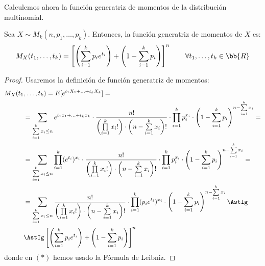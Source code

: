 Calculemos ahora la función generatriz de momentos de la distribución multinomial.
\begin{prop}
    Sea $X\sim M_k(n, p_1, \ldots, p_k)$. Entonces, la función generatriz de momentos de $X$ es:
    \begin{equation*}
        M_X(t_1, \ldots, t_k)=\left[\left(\sum_{i=1}^k p_i e^{t_i}\right) + \left(1-\sum_{i=1}^k p_i\right)\right]^n \qquad \forall t_1, \ldots, t_k\in \bb{R}
    \end{equation*}
\end{prop}
\begin{proof}
    Usaremos la definición de función generatriz de momentos:
    \begin{align*}
        M_X(t_1&, \ldots, t_k)=E[e^{t_1 X_1+\ldots+t_k X_k}]
        =\\&=
        \sum_{\sum\limits_{i=1}^k x_i\leq n} e^{t_1 x_1+\ldots+t_k x_k}\cdot \dfrac{n!}{\left(\prod\limits_{i=1}^k x_i!\right)\cdot \left(n-\sum\limits_{i=1}^k x_i\right)!}\cdot \prod_{i=1}^{k} p_i^{x_i} \cdot \left(1-\sum\limits_{i=1}^k p_i\right)^{n-\sum\limits_{i=1}^k x_i}
        =\\&=
        \sum_{\sum\limits_{i=1}^k x_i\leq n} \prod_{i=1}^k (e^{t_i})^{x_i}\cdot \dfrac{n!}{\left(\prod\limits_{i=1}^k x_i!\right)\cdot \left(n-\sum\limits_{i=1}^k x_i\right)!}\cdot \prod_{i=1}^{k} p_i^{x_i} \cdot \left(1-\sum\limits_{i=1}^k p_i\right)^{n-\sum\limits_{i=1}^k x_i}
        =\\&=
        \sum_{\sum\limits_{i=1}^k x_i\leq n} \dfrac{n!}{\left(\prod\limits_{i=1}^k x_i!\right)\cdot \left(n-\sum\limits_{i=1}^k x_i\right)!}\cdot \prod_{i=1}^{k} (p_ie^{t_i})^{x_i} \cdot \left(1-\sum\limits_{i=1}^k p_i\right)^{n-\sum\limits_{i=1}^k x_i}
        \AstIg\\&\AstIg
        \left[\left(\sum_{i=1}^k p_i e^{t_i}\right)+\left(1-\sum_{i=1}^k p_i\right)\right]^n
    \end{align*}
    donde en $(\ast)$ hemos usado la Fórmula de Leibniz.
\end{proof}

